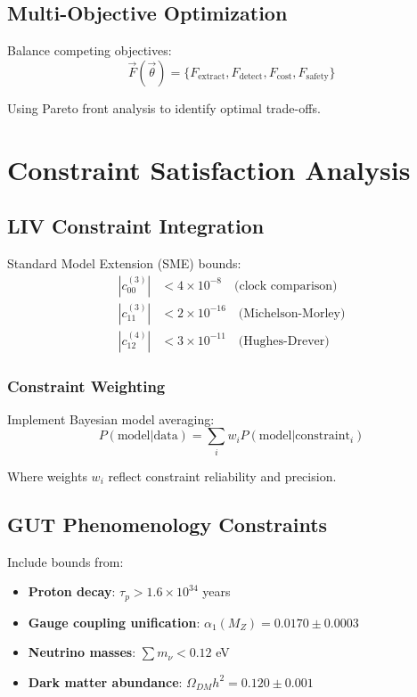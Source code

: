 \documentclass[11pt]{article}
\begin{document}
\subsection{Multi-Objective Optimization}

Balance competing objectives:
\begin{equation}
\vec{F}(\vec{\theta}) = \{F_{\text{extract}}, F_{\text{detect}}, F_{\text{cost}}, F_{\text{safety}}\}
\end{equation}

Using Pareto front analysis to identify optimal trade-offs.

\section{Constraint Satisfaction Analysis}

\subsection{LIV Constraint Integration}

Standard Model Extension (SME) bounds:
\begin{align}
|c_{00}^{(3)}| &< 4 \times 10^{-8} \quad \text{(clock comparison)} \\
|c_{11}^{(3)}| &< 2 \times 10^{-16} \quad \text{(Michelson-Morley)} \\
|c_{12}^{(4)}| &< 3 \times 10^{-11} \quad \text{(Hughes-Drever)}
\end{align}

\subsubsection{Constraint Weighting}

Implement Bayesian model averaging:
\begin{equation}
P(\text{model}|\text{data}) = \sum_i w_i P(\text{model}|\text{constraint}_i)
\end{equation}

Where weights $w_i$ reflect constraint reliability and precision.

\subsection{GUT Phenomenology Constraints}

Include bounds from:
\begin{itemize}
    \item \textbf{Proton decay}: $\tau_p > 1.6 \times 10^{34}$ years
    \item \textbf{Gauge coupling unification}: $\alpha_1(M_Z) = 0.0170 \pm 0.0003$
    \item \textbf{Neutrino masses}: $\sum m_\nu < 0.12$ eV
    \item \textbf{Dark matter abundance}: $\Omega_{DM} h^2 = 0.120 \pm 0.001$
\end{itemize}
\end{document}
